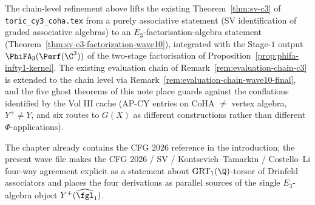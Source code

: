 \begin{remark}
\label{rem:chapter-integration-wave10}
The chain-level refinement above lifts the existing
Theorem~\ref{thm:sv-c3} of \texttt{toric\_cy3\_coha.tex} from a
purely associative statement (SV identification of graded associative
algebras) to an $E_3$-factorisation-algebra statement
(Theorem~\ref{thm:sv-e3-factorization-wave10}), integrated with the
Stage-$1$ output $\PhiFA_3(\Perf(\C^3))$ of the two-stage factorisation
of Proposition~\ref{prop:phifa-infty1-kernel}. The existing evaluation
chain of Remark~\ref{rem:evaluation-chain-c3} is extended to the chain
level via Remark~\ref{rem:evaluation-chain-wave10-final}, and the
five ghost theorems of this note place guards against the conflations
identified by the Vol III cache (AP-CY entries on CoHA $\neq$ vertex
algebra, $Y^+ \neq Y$, and six routes to $G(X)$ as different
constructions rather than different $\Phi$-applications).

The chapter already contains the CFG $2026$ reference in the
introduction; the present wave file makes the CFG $2026$ / SV /
Kontsevich--Tamarkin / Costello--Li four-way agreement explicit as a
statement about $\mathrm{GRT}_1(\Q)$-torsor of Drinfeld associators
and places the four derivations as parallel sources of the single
$E_3$-algebra object $Y^+(\widehat{\fgl}_1)$.
\end{remark}

